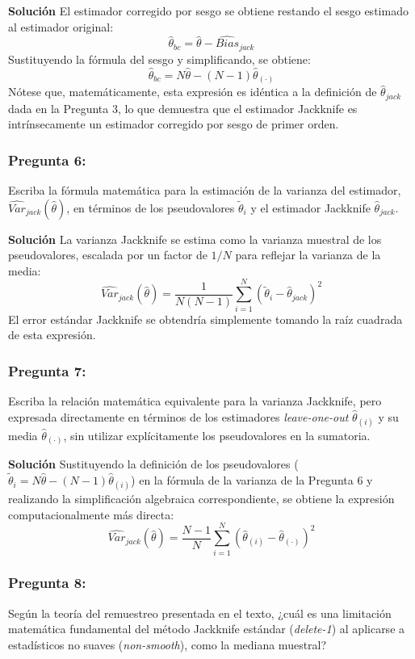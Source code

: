 \documentclass[a4paper]{article}
\begin{document}
\textbf{Solución}
El estimador corregido por sesgo se obtiene restando el sesgo estimado al estimador original:
$$ \hat{\theta}_{bc} = \hat{\theta} - \widehat{Bias}_{jack} $$
Sustituyendo la fórmula del sesgo y simplificando, se obtiene:
$$ \hat{\theta}_{bc} = N\hat{\theta} - (N-1)\hat{\theta}_{(\cdot)} $$
Nótese que, matemáticamente, esta expresión es idéntica a la definición de $\hat{\theta}_{jack}$ dada en la Pregunta 3, lo que demuestra que el estimador Jackknife es intrínsecamente un estimador corregido por sesgo de primer orden.

\subsubsection{Pregunta 6:} Escriba la fórmula matemática para la estimación de la varianza del estimador, $\widehat{Var}_{jack}(\hat{\theta})$, en términos de los pseudovalores $\tilde{\theta}_i$ y el estimador Jackknife $\hat{\theta}_{jack}$.

\textbf{Solución}
La varianza Jackknife se estima como la varianza muestral de los pseudovalores, escalada por un factor de $1/N$ para reflejar la varianza de la media:
$$ \widehat{Var}_{jack}(\hat{\theta}) = \frac{1}{N(N-1)} \sum_{i=1}^N (\tilde{\theta}_i - \hat{\theta}_{jack})^2 $$
El error estándar Jackknife se obtendría simplemente tomando la raíz cuadrada de esta expresión.

\subsubsection{Pregunta 7:} Escriba la relación matemática equivalente para la varianza Jackknife, pero expresada directamente en términos de los estimadores \textit{leave-one-out} $\hat{\theta}_{(i)}$ y su media $\hat{\theta}_{(\cdot)}$, sin utilizar explícitamente los pseudovalores en la sumatoria.

\textbf{Solución}
Sustituyendo la definición de los pseudovalores ($\tilde{\theta}_i = N\hat{\theta} - (N-1)\hat{\theta}_{(i)}$) en la fórmula de la varianza de la Pregunta 6 y realizando la simplificación algebraica correspondiente, se obtiene la expresión computacionalmente más directa:
$$ \widehat{Var}_{jack}(\hat{\theta}) = \frac{N-1}{N} \sum_{i=1}^N (\hat{\theta}_{(i)} - \hat{\theta}_{(\cdot)})^2 $$

\subsubsection{Pregunta 8:} Según la teoría del remuestreo presentada en el texto, ¿cuál es una limitación matemática fundamental del método Jackknife estándar (\textit{delete-1}) al aplicarse a estadísticos no suaves (\textit{non-smooth}), como la mediana muestral?
\end{document}
